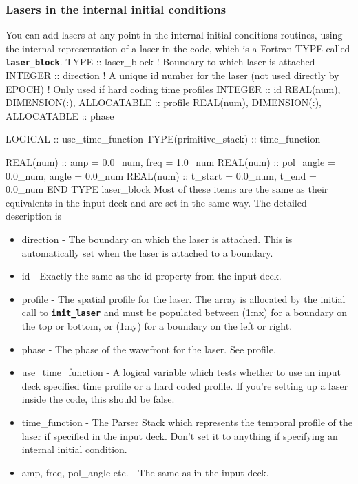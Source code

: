 \documentclass[12pt,a4paper]{article}
\newcommand{\inlinecode}[1]{{\color{warwickred} \bf\texttt{#1}}}
\newenvironment{boxverbatim}{\lboxverbatim{none}}{\endlboxverbatim}
\begin{document}
\subsubsection{Lasers in the internal initial conditions}
You can add lasers at any point in the internal initial conditions routines,
using the internal representation of a laser in the code, which is a Fortran
TYPE called \inlinecode{laser\_block}.
\begin{boxverbatim}
TYPE :: laser_block
  ! Boundary to which laser is attached
  INTEGER :: direction
  ! A unique id number for the laser (not used directly by EPOCH)
  ! Only used if hard coding time profiles
  INTEGER :: id
  REAL(num), DIMENSION(:), ALLOCATABLE :: profile
  REAL(num), DIMENSION(:), ALLOCATABLE :: phase

  LOGICAL :: use_time_function
  TYPE(primitive_stack) :: time_function

  REAL(num) :: amp = 0.0_num, freq = 1.0_num
  REAL(num) :: pol_angle = 0.0_num, angle = 0.0_num
  REAL(num) :: t_start = 0.0_num, t_end = 0.0_num
END TYPE laser_block
\end{boxverbatim}
Most of these items are the same as their equivalents in the input deck and
are set in the same way. The detailed description is
\begin{itemize}
\item direction - The boundary on which the laser is attached. This is
  automatically set when the laser is attached to a boundary.
\item id - Exactly the same as the id property from the input deck.
\item profile - The spatial profile for the laser. The array is allocated by
  the initial call to \inlinecode{init\_laser} and must be populated between
  (1:nx) for a boundary on the top or bottom, or (1:ny) for a boundary on the
  left or right.
\item phase - The phase of the wavefront for the laser. See profile.
\item use\_time\_function - A logical variable which tests whether to use an
  input deck specified time profile or a hard coded profile. If you're setting
  up a laser inside the code, this should be false.
\item time\_function - The Parser Stack which represents the temporal profile of
  the laser if specified in the input deck. Don't set it to anything if
  specifying an internal initial condition.
\item amp, freq, pol\_angle etc. - The same as in the input deck.
\end{itemize}
\end{document}
